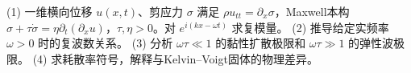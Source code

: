 (1) 一维横向位移 \(u(x,t)\)、剪应力 \(\sigma\) 满足 \(\rho u_{tt}=\partial_x\sigma\)，Maxwell本构 \(\sigma+\tau\dot\sigma=\eta\partial_t(\partial_xu)\)，\(\tau,\eta>0\)。对 \(e^{i(kx-\omega t)}\) 求复模量。
(2) 推导给定实频率 \(\omega>0\) 时的复波数关系。
(3) 分析 \(\omega\tau\ll1\) 的黏性扩散极限和 \(\omega\tau\gg1\) 的弹性波极限。
(4) 求耗散率符号，解释与Kelvin--Voigt固体的物理差异。
